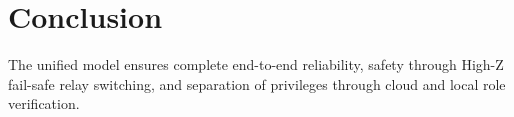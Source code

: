 \documentclass[12pt,a4paper]{article}
\begin{document}
\section{Conclusion}
The unified model ensures complete end-to-end reliability, safety through High-Z fail-safe relay switching, and separation of privileges through cloud and local role verification.
\end{document}
